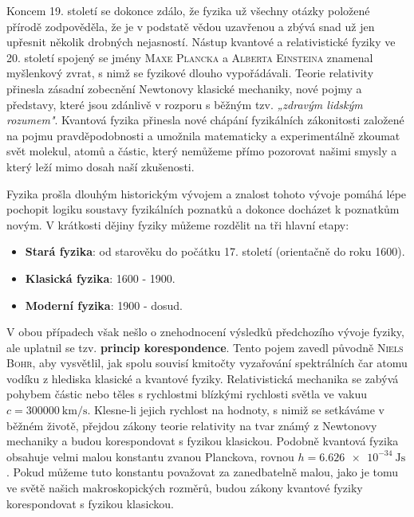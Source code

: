      Koncem 19. století se dokonce zdálo, že fyzika už všechny otázky položené přírodě zodpověděla,
      že je v podstatě vědou uzavřenou a zbývá snad už jen upřesnit několik drobných nejasností.
      Nástup kvantové a relativistické fyziky ve 20. století spojený se jmény \textsc{Maxe Plancka}
      a \textsc{Alberta Einsteina} znamenal myšlenkový zvrat, s nimž se fyzikové dlouho
      vypořádávali. Teorie relativity přinesla zásadní zobecnění Newtonovy klasické mechaniky, nové
      pojmy a představy, které jsou zdánlivě v rozporu s běžným tzv. \emph{„zdravým lidským
      rozumem"}. Kvantová fyzika přinesla nové chápání fyzikálních zákonitosti založené na pojmu
      pravděpodobnosti a umožnila matematicky a experimentálně zkoumat svět molekul, atomů a částic,
      který nemůžeme přímo pozorovat našimi smysly a který leží mimo dosah naší zkušenosti.

      \begin{tcnote}  
        Fyzika prošla dlouhým historickým vývojem a znalost tohoto vývoje pomáhá lépe pochopit
        logiku soustavy fyzikálních poznatků a dokonce docházet k poznatkům novým. V krátkosti
        dějiny fyziky můžeme rozdělit na tři hlavní etapy:
        \begin{itemize}[noitemsep]
          \item \textbf{Stará fyzika}: od starověku do počátku 17. století (orientačně do roku
                1600).
          \item \textbf{Klasická fyzika}: 1600 - 1900.
          \item \textbf{Moderní fyzika}: 1900 - dosud.
        \end{itemize}
      \end{tcnote}

      V obou případech však nešlo o znehodnocení výsledků předchozího vývoje fyziky, ale uplatnil se
      tzv. \textbf{princip korespondence}. Tento pojem zavedl původně \textsc{Niels Bohr}, aby
      vysvětlil, jak spolu souvisí kmitočty vyzařování spektrálních čar atomu vodíku z hlediska
      klasické a kvantové fyziky. Relativistická mechanika se zabývá pohybem částic nebo těles s
      rychlostmi blízkými rychlosti světla ve vakuu \(c=\SI{300000}{\km\per\s}\). Klesne-li jejich
      rychlost na hodnoty, s nimiž se setkáváme v běžném životě, přejdou zákony teorie relativity na
      tvar známý z Newtonovy mechaniky a budou korespondovat s fyzikou klasickou. Podobně kvantová
      fyzika obsahuje velmi malou konstantu zvanou Planckova, rovnou \(h =
      \SI{6.626e-34}{\joule\s}\). Pokud můžeme tuto konstantu považovat za zanedbatelně malou,
      jako je tomu ve světě našich makroskopických rozměrů, budou zákony kvantové fyziky
      korespondovat s fyzikou klasickou.   

